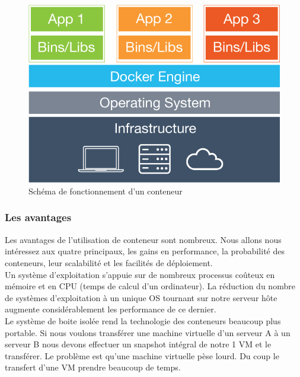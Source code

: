 \documentclass{report}
\begin{document}
        \begin{figure}
          \begin{center}
            \includegraphics[scale=0.2]{images/container.png}
          \end{center}
          \caption{Schéma de fonctionnement d'un conteneur}
          \label{Container}
        \end{figure}

        \subsubsection{Les avantages}
        Les avantages de l’utilisation de conteneur sont nombreux. Nous allons nous intéressez aux quatre principaux, les gains en performance, la probabilité des conteneurs, leur scalabilité et les facilités de déploiement.\\

        Un système d’exploitation s’appuie sur de nombreux processus coûteux en mémoire et en CPU (temps de calcul d’un ordinateur). La réduction du nombre de systèmes d’exploitation à un unique OS tournant sur notre serveur hôte augmente considérablement les performance de ce dernier.\\

        Le système de boite isolée rend la technologie des conteneurs beaucoup plus portable. Si nous voulons transférer une machine virtuelle d’un serveur A à un serveur B nous devons effectuer un snapshot intégral de notre 1 VM et le transférer. Le problème est qu’une machine virtuelle pèse lourd. Du coup le transfert d’une VM prendre beaucoup de temps.\\
\end{document}
